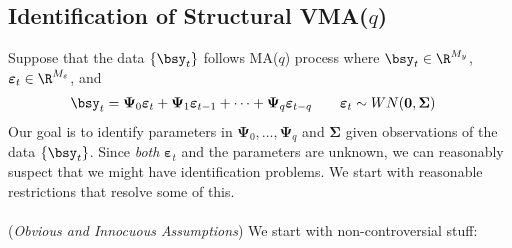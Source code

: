 \documentclass[12pt]{article}
\theoremstyle{plain}
\theoremstyle{definition}
\theoremstyle{remark}
\newcommand{\bsSigma}{\boldsymbol{\Sigma}}
\newcommand{\bsvarepsilon}{\boldsymbol{\varepsilon}}
\newcommand{\bsPsi}{\boldsymbol{\Psi}}
\renewcommand{\bso}{\boldsymbol{0}}
\begin{document}
\clearpage
\subsection{Identification of Structural VMA($q$)}


Suppose that the data $\{\bsy_t\}$ follows MA($q$) process where
$\bsy_t\in\R^{M_y}$, $\bsvarepsilon_t\in\R^{M_\varepsilon}$, and
\begin{align*}
  \bsy_t &=
  \bsPsi_0\bsvarepsilon_t
  +
  \bsPsi_1\bsvarepsilon_{t-1}
  +\dots+
  \bsPsi_q\bsvarepsilon_{t-q}
  \qquad \bsvarepsilon_t \sim WN(\bso,\bsSigma)
\end{align*}
Our goal is to identify parameters in $\bsPsi_0,\ldots,\bsPsi_q$ and
$\bsSigma$ given observations of the data $\{\bsy_t\}$.
Since \emph{both} $\bsvarepsilon_t$ and the parameters are unknown, we
can reasonably suspect that we might have identification problems.
We start with reasonable restrictions that resolve some of this.
\\
\\
(\emph{Obvious and Innocuous Assumptions})
We start with non-controversial stuff:
\end{document}
